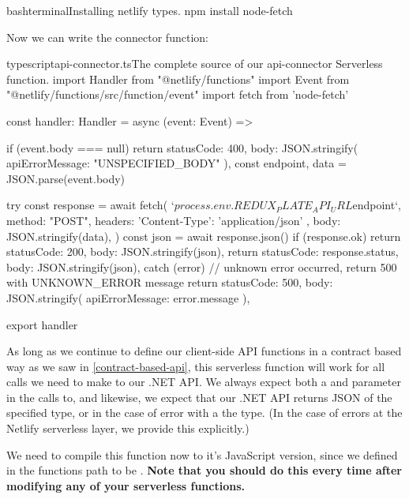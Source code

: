 \documentclass[paper=6in:9in,pagesize=pdftex,headinclude=on,footinclude=on,12pt,twoside]{scrbook}
\begin{document}
\begin{codeInput}{bash}{terminal}{Installing netlify types.}
npm install node-fetch
\end{codeInput}

Now we can write the connector function:

\begin{codeInput}{typescript}{api-connector.ts}{The complete source of our api-connector Serverless function.}
import { Handler } from "@netlify/functions"
import { Event } from "@netlify/functions/src/function/event"
import fetch from 'node-fetch'

const handler: Handler = async (event: Event) => {
  if (event.body === null) {
    return {
      statusCode: 400,
      body: JSON.stringify({ apiErrorMessage: "UNSPECIFIED_BODY" }),
    }
  }
  const { endpoint, data } = JSON.parse(event.body)

  try {
    const response = await fetch(
      `${process.env.REDUX_PLATE_API_URL}${endpoint}`,
      {
        method: "POST",
        headers: {
          'Content-Type': 'application/json'
        },
        body: JSON.stringify(data),
      }
    )
    const json = await response.json()
    if (response.ok) {
      return {
        statusCode: 200,
        body: JSON.stringify(json),
      }
    }
    return {
      statusCode: response.status,
      body: JSON.stringify(json),
    }
  } catch (error) {
    // unknown error occurred, return 500 with UNKNOWN_ERROR message
    return {
      statusCode: 500,
      body: JSON.stringify({ apiErrorMessage: error.message }),
    }
  }
}

export { handler }  
\end{codeInput}

As long as we continue to define our client-side API functions in a contract based way as we saw in \ref{contract-based-api}, this  serverless function will work for all calls we need to make to our .NET API. We always expect both a  and  parameter in the calls to, and likewise, we expect that our .NET API returns JSON of the specified type, or in the case of error with a the  type. (In the case of errors at the Netlify serverless layer, we provide this  explicitly.)


We need to compile this function now to it's JavaScript version, since we defined in  the functions path to be . \textbf{Note that you should do this every time after modifying any of your serverless functions.}
\end{document}
